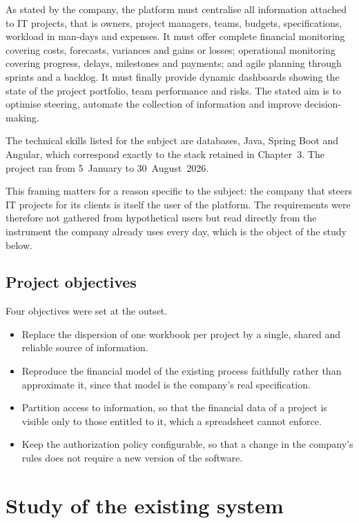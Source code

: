 As stated by the company, the platform must centralise all information attached to IT projects,
that is owners, project managers, teams, budgets, specifications, workload in man-days and
expenses. It must offer complete financial monitoring covering costs, forecasts, variances and
gains or losses; operational monitoring covering progress, delays, milestones and payments; and
agile planning through sprints and a backlog. It must finally provide dynamic dashboards showing
the state of the project portfolio, team performance and risks. The stated aim is to optimise
steering, automate the collection of information and improve decision-making.

The technical skills listed for the subject are databases, Java, Spring Boot and Angular, which
correspond exactly to the stack retained in Chapter~3. The project ran from 5~January to
30~August~2026.

This framing matters for a reason specific to the subject: the company that steers IT projects for
its clients is itself the user of the platform. The requirements were therefore not gathered from
hypothetical users but read directly from the instrument the company already uses every day, which
is the object of the study below.

\subsection{Project objectives}
Four objectives were set at the outset.

\begin{itemize}
  \item Replace the dispersion of one workbook per project by a single, shared and reliable source
        of information.
  \item Reproduce the financial model of the existing process faithfully rather than approximate
        it, since that model is the company's real specification.
  \item Partition access to information, so that the financial data of a project is visible only to
        those entitled to it, which a spreadsheet cannot enforce.
  \item Keep the authorization policy configurable, so that a change in the company's rules does not
        require a new version of the software.
\end{itemize}

\section{Study of the existing system}


